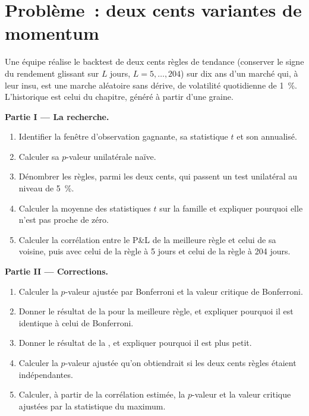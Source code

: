 \section{Problème~: deux cents variantes de momentum}

\begin{problem}\label{pb:qm:testing-and-multiple-testing:1}
Une équipe réalise le backtest de deux cents règles de tendance (conserver le signe du rendement glissant sur $L$ jours, $L = 5, \dots, 204$) sur dix ans d'un
marché qui, à leur insu, est une marche aléatoire sans dérive, de volatilité quotidienne de 1~\%. L'historique est celui du chapitre, généré à partir d'une graine.

\medskip\noindent\textbf{Partie I --- La recherche.}
\begin{enumerate}
\item Identifier la fenêtre d'observation gagnante, sa statistique $t$ et son  annualisé.
\item Calculer sa $p$-valeur unilatérale naïve.
\item Dénombrer les règles, parmi les deux cents, qui passent un test unilatéral au niveau de 5~\%.
\item Calculer la moyenne des statistiques $t$ sur la famille et expliquer pourquoi elle n'est pas proche de zéro.
\item Calculer la corrélation entre le P\&L de la meilleure règle et celui de sa voisine, puis avec celui de la règle à 5 jours et celui de la règle à 204 jours.
\end{enumerate}

\medskip\noindent\textbf{Partie II --- Corrections.}
\begin{enumerate}[resume]
\item Calculer la $p$-valeur ajustée par Bonferroni et la valeur critique de Bonferroni.
\item Donner le résultat de la  pour la meilleure règle, et expliquer pourquoi il est identique à celui de Bonferroni.
\item Donner le résultat de la , et expliquer pourquoi il est plus petit.
\item Calculer la $p$-valeur ajustée qu'on obtiendrait si les deux cents règles étaient indépendantes.
\item Calculer, à partir de la corrélation estimée, la $p$-valeur et la valeur critique ajustées par la statistique du maximum.
\end{enumerate}


\end{problem}
